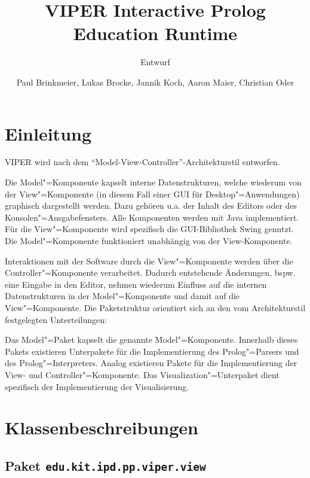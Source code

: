 \documentclass[parskip=full,11pt,twoside]{scrartcl}
\title{VIPER Interactive Prolog Education Runtime}
\subtitle{Entwurf}
\author{Paul Brinkmeier, Lukas Brocke, Jannik Koch, Aaron Maier, Christian Oder}
\begin{document}
\maketitle

\section{Einleitung}

VIPER wird nach dem \enquote{Model-View-Controller}-Architekturstil entworfen.

Die Model"=Komponente kapselt interne Datenstrukturen, welche wiederum von der View"=Komponente (in diesem Fall einer GUI für Desktop"=Anwendungen) graphisch dargestellt werden. Dazu gehören u.a. der Inhalt des Editors oder des Konsolen"=Ausgabefensters. Alle Komponenten werden mit Java implementiert. Für die View"=Komponente wird spezifisch die GUI-Bibliothek Swing genutzt. Die Model"=Komponente funktioniert unabhängig von der View-Komponente.

Interaktionen mit der Software durch die View"=Komponente werden über die Controller"=Komponente verarbeitet. Dadurch entstehende Änderungen, bspw. eine Eingabe in den Editor, nehmen wiederum Einfluss auf die internen Datenstrukturen in der Model"=Komponente und damit auf die View"=Komponente. Die Paketstruktur orientiert sich an den vom Architekturstil festgelegten Unterteilungen:\\

\begin{center}
	\begin{minipage}{0.4\textwidth}%
	\end{minipage}
\end{center}

Das Model"=Paket kapselt die genannte Model"=Komponente. Innerhalb dieses Pakets existieren Unterpakete für die Implementierung des Prolog"=Parsers und des Prolog"=Interpreters. Analog existieren Pakete für die Implementierung der View- und Controller"=Komponente. Das Visualization"=Unterpaket dient spezifisch der Implementierung der Visualisierung.

\section{Klassenbeschreibungen}

\subsection{Paket \texttt{edu.kit.ipd.pp.viper.view}}
\end{document}
